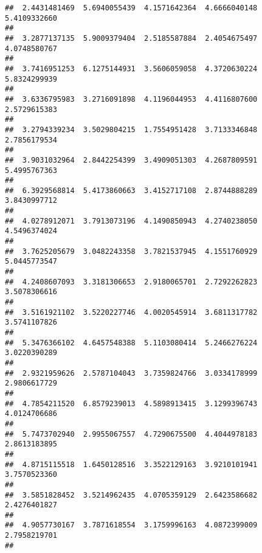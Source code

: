 \documentclass[]{article}
\begin{document}
\begin{verbatim}
##  2.4431481469  5.6940055439  4.1571642364  4.6666040148  5.4109332660 
##                                                                       
##  3.2877137135  5.9009379404  2.5185587884  2.4054675497  4.0748580767 
##                                                                       
##  3.7416951253  6.1275144931  3.5606059058  4.3720630224  5.8324299939 
##                                                                       
##  3.6336795983  3.2716091898  4.1196044953  4.4116807600  2.5729615383 
##                                                                       
##  3.2794339234  3.5029804215  1.7554951428  3.7133346848  2.7856179534 
##                                                                       
##  3.9031032964  2.8442254399  3.4909051303  4.2687809591  5.4995767363 
##                                                                       
##  6.3929568814  5.4173860663  3.4152717108  2.8744888289  3.8430997712 
##                                                                       
##  4.0278912071  3.7913073196  4.1490850943  4.2740238050  4.5496374024 
##                                                                       
##  3.7625205679  3.0482243358  3.7821537945  4.1551760929  5.0445773547 
##                                                                       
##  4.2408607093  3.3181306653  2.9180065701  2.7292262823  3.5078306616 
##                                                                       
##  3.5161921102  3.5220227746  4.0020545914  3.6811317782  3.5741107826 
##                                                                       
##  5.3476366102  4.6457548388  5.1103080414  5.2466276224  3.0220390289 
##                                                                       
##  2.9321959626  2.5787104043  3.7359824766  3.0334178999  2.9806617729 
##                                                                       
##  4.7854211520  6.8579239013  4.5898913415  3.1299396743  4.0124706686 
##                                                                       
##  5.7473702940  2.9955067557  4.7290675500  4.4044978183  2.8613183895 
##                                                                       
##  4.8715115518  1.6450128516  3.3522129163  3.9210101941  3.7570523360 
##                                                                       
##  3.5851828452  3.5214962435  4.0705359129  2.6423586682  2.4276401827 
##                                                                       
##  4.9057730167  3.7871618554  3.1759996163  4.0872399009  2.7958219701 
##                                                                       

\end{verbatim}
\end{document}
